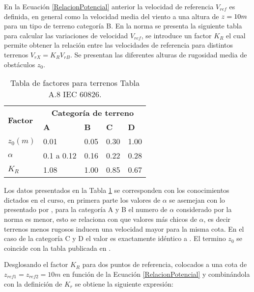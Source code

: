 En la Ecuación \eqref{RelacionPotencial} anterior la velocidad de referencia $V_{ref}$ es definida, en general como la velocidad media del viento a una altura de $z=10\vspace{.1cm}m$ para un tipo de terreno categoría B. En la norma se presenta la siguiente tabla para calcular las variaciones de velocidad $V_{ref}$, se introduce un factor $K_R$ el cual permite obtener la relación entre las velocidades de referencia para distintos terrenos $V_{rX}=K_RV_{rB}$. Se presentan las diferentes alturas de rugosidad media de obstáculos $z_0$.


\begin{table}[h] 
	\begin{footnotesize} 
		\begin{center} 
			\begin{tabular}{ |p{3cm}|p{2cm}|p{2cm}|p{2cm}|p{2cm}|} \hline
				\multirow{2}{*}{\textbf{Factor}}  & \multicolumn{4}{|c|}{ \textbf{Categoría de terreno} }  \\ 
				& \textbf{A}& \textbf{B} &\textbf{C}&\textbf{D}\\
				\hline
				$z_0(m)$   & 0.01    &0.05&  0.30 & 1.00\\ \hline
				$\alpha$& 0.1 a 0.12  & 0.16 & 0.22 &0.28\\ \hline
				$K_R$ & 1.08 &1.00 &0.85&  0.67\\ \hline
			\end{tabular}
		\end{center} 
		\caption{Tabla de factores para terrenos Tabla A.8 IEC 60826.}
	\label{Tab:laValoresTerrenos} 
	\end{footnotesize} 
\end{table}

Los datos presentados en la Tabla \ref{Tab:laValoresTerrenos} se corresponden con los conocimientos dictados en el curso, en primera parte los valores de $\alpha$ se asemejan con lo presentado por \cite{Davenport1960}, para la categoría A y B el numero de $\alpha$ considerado por la norma es menor, esto se relaciona con que valores más chicos de $\alpha$, es decir terrenos menos rugosos inducen una velocidad mayor para la misma cota. En el caso de la categoría C y D el valor es exactamente idéntico a \cite{Davenport1960} . El termino $z_0$ se coincide con la tabla publicada en \cite{Oke2000}.

Desglosando el factor $K_R$ para dos puntos de referencia, colocados a una cota de $z_{ref1}=z_{ref2}=10m$ en función de la Ecuación \eqref{RelacionPotencial} y combinándola con la definición de $K_r$ se obtiene la siguiente expresión: 


